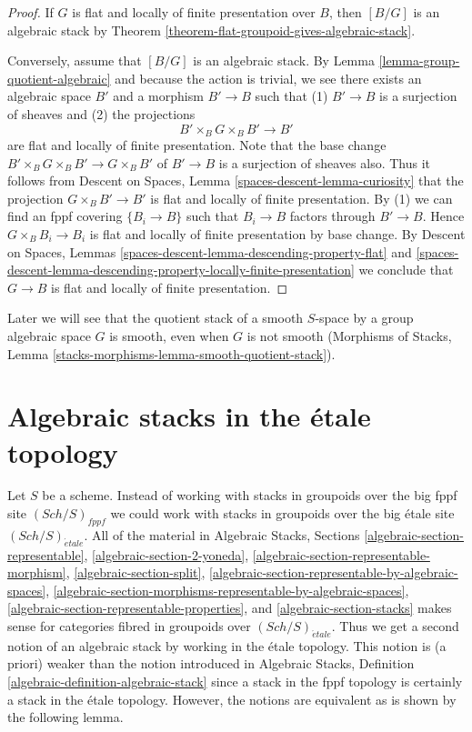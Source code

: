 \documentclass{stacks-project}
\theoremstyle{plain}
\theoremstyle{definition}
\theoremstyle{remark}
\numberwithin{equation}{subsection}
\def\Sch{\mathit{Sch}}
\def\etale{{\acute{e}tale}}
\begin{document}
\begin{proof}
If $G$ is flat and locally of finite presentation over $B$, then
$[B/G]$ is an algebraic stack by
Theorem \ref{theorem-flat-groupoid-gives-algebraic-stack}.

\medskip\noindent
Conversely, assume that $[B/G]$ is an algebraic stack. By
Lemma \ref{lemma-group-quotient-algebraic}
and because the action is trivial, we see
there exists an algebraic space $B'$ and a morphism
$B' \to B$ such that (1) $B' \to B$ is a surjection
of sheaves and (2) the projections
$$
B' \times_B G \times_B B' \to B'
$$
are flat and locally of finite presentation. Note that the base change
$B' \times_B G \times_B B' \to G \times_B B'$ of $B' \to B$
is a surjection of sheaves also. Thus it follows from
Descent on Spaces, Lemma \ref{spaces-descent-lemma-curiosity}
that the projection $G \times_B B' \to B'$ is flat and locally
of finite presentation. By (1) we can find an fppf covering
$\{B_i \to B\}$ such that $B_i \to B$ factors through $B' \to B$.
Hence $G \times_B B_i \to B_i$ is flat and locally of finite presentation
by base change. By
Descent on Spaces, Lemmas
\ref{spaces-descent-lemma-descending-property-flat} and
\ref{spaces-descent-lemma-descending-property-locally-finite-presentation}
we conclude that $G \to B$ is flat and locally of finite presentation.
\end{proof}

\noindent
Later we will see that the quotient stack of a smooth $S$-space
by a group algebraic space $G$ is smooth, even when $G$ is not smooth
(Morphisms of Stacks, Lemma
\ref{stacks-morphisms-lemma-smooth-quotient-stack}).




\section{Algebraic stacks in the \'etale topology}
\label{section-stacks-etale}

\noindent
Let $S$ be a scheme. Instead of working with stacks in groupoids over
the big fppf site $(\Sch/S)_{fppf}$ we could work with stacks in groupoids
over the big \'etale site $(\Sch/S)_\etale$. All of the material in
Algebraic Stacks, Sections
\ref{algebraic-section-representable},
\ref{algebraic-section-2-yoneda},
\ref{algebraic-section-representable-morphism},
\ref{algebraic-section-split},
\ref{algebraic-section-representable-by-algebraic-spaces},
\ref{algebraic-section-morphisms-representable-by-algebraic-spaces},
\ref{algebraic-section-representable-properties}, and
\ref{algebraic-section-stacks}
makes sense for categories fibred in groupoids over $(\Sch/S)_\etale$.
Thus we get a second notion of an algebraic stack by working in the
\'etale topology. This notion is (a priori) weaker than the notion introduced
in Algebraic Stacks, Definition \ref{algebraic-definition-algebraic-stack}
since a stack in the fppf topology is certainly a stack in the \'etale
topology. However, the notions are equivalent as is shown by the following
lemma.
\end{document}

